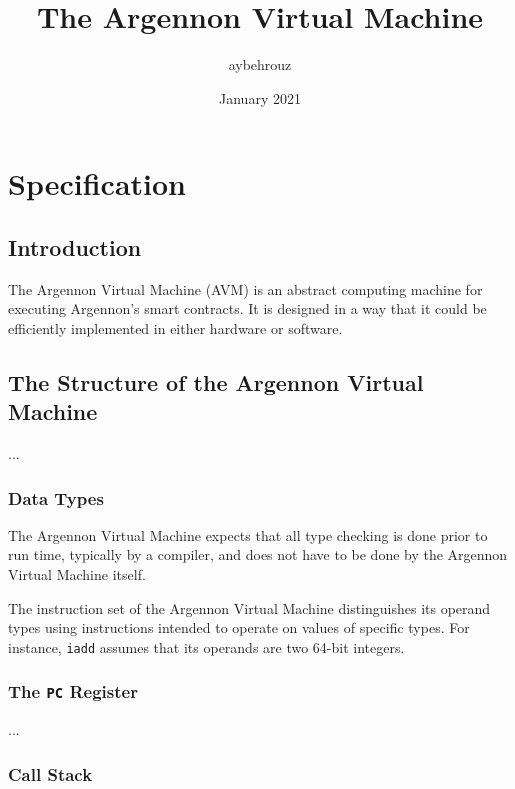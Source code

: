 \documentclass[11pt, A4]{report}
\title{The Argennon Virtual Machine}
\author{aybehrouz}
\date{January 2021}
\begin{document}
    \maketitle


    \chapter{Specification}\label{ch:specification}


    \section{Introduction}\label{sec:introduction}

    The Argennon Virtual Machine (AVM) is an abstract computing machine for executing Argennon's smart contracts. It
    is designed in a way that it could be efficiently implemented in either hardware or software.


    \section{The Structure of the Argennon Virtual Machine}\label{sec:the-structure-of-the-algorand-virtual-machine}

    ...

    \subsection{Data Types}\label{subsec:data-types}

    The Argennon Virtual Machine expects that all type checking is done prior to run time, typically by a compiler,
    and does not have to be done by the Argennon Virtual Machine itself.

    The instruction set of the Argennon Virtual Machine distinguishes its operand types using instructions intended to
    operate on values of specific types. For instance, \texttt{iadd} assumes that its operands are two 64-bit integers.

    \subsection{The \texttt{PC} Register}\label{subsec:the-pc-register}

    ...

    \subsection{Call Stack}\label{subsec:call-stack}
\end{document}
